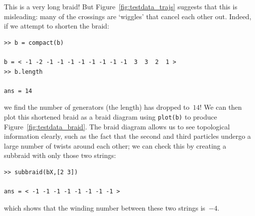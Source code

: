 \documentclass[12pt]{article}
\begin{document}
This is a very long braid!  But Figure~\ref{fig:testdata_trajs}
suggests that this is misleading: many of the crossings are `wiggles'
that cancel each other out.  Indeed, if we attempt to shorten the
braid:
\begin{lstlisting}[frame=single,framerule=0pt]
>> b = compact(b)

b = < -1 -2 -1 -1 -1 -1 -1 -1 -1 -1  3  3  2  1 >
>> b.length

ans = 14
\end{lstlisting}
we find the number of generators (the length) has dropped to~$14$!  We
can then plot this shortened braid as a braid diagram using
\lstinline{plot(b)} to produce Figure~\ref{fig:testdata_braid}.  The
braid diagram allows us to see topological information clearly, such
as the fact that the second and third particles undergo a large number
of twists around each other; we can check this by creating a subbraid
with only those two strings:
\begin{lstlisting}[frame=single,framerule=0pt]
>> subbraid(bX,[2 3])

ans = < -1 -1 -1 -1 -1 -1 -1 -1 >
\end{lstlisting}
which shows that the winding number between these two strings is~$-4$.
\end{document}
